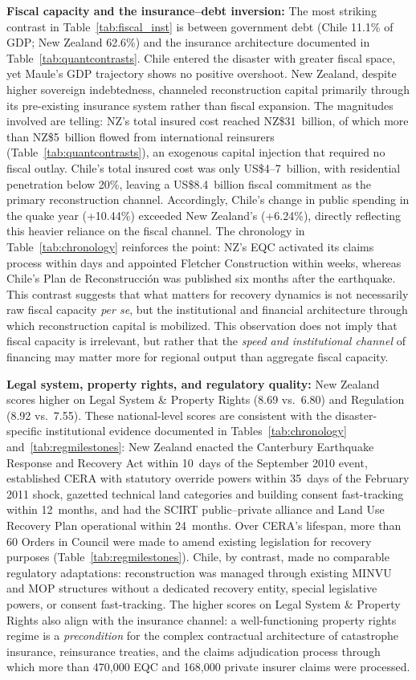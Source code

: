 \documentclass[12pt]{article}
\begin{document}
\textbf{Fiscal capacity and the insurance--debt inversion:} The most striking contrast in Table~\ref{tab:fiscal_inst} is between government debt (Chile 11.1\% of GDP; New Zealand 62.6\%) and the insurance architecture documented in Table~\ref{tab:quantcontrasts}. Chile entered the disaster with greater fiscal space, yet Maule's GDP trajectory shows no positive overshoot. New Zealand, despite higher sovereign indebtedness, channeled reconstruction capital primarily through its pre-existing insurance system rather than fiscal expansion. The magnitudes involved are telling: NZ's total insured cost reached NZ\$31~billion, of which more than NZ\$5~billion flowed from international reinsurers (Table~\ref{tab:quantcontrasts}), an exogenous capital injection that required no fiscal outlay. Chile's total insured cost was only US\$4--7~billion, with residential penetration below 20\%, leaving a US\$8.4~billion fiscal commitment as the primary reconstruction channel. Accordingly, Chile's change in public spending in the quake year (+10.44\%) exceeded New Zealand's (+6.24\%), directly reflecting this heavier reliance on the fiscal channel. The chronology in Table~\ref{tab:chronology} reinforces the point: NZ's EQC activated its claims process within days and appointed Fletcher Construction within weeks, whereas Chile's Plan de Reconstrucci{\'o}n was published six months after the earthquake. This contrast suggests that what matters for recovery dynamics is not necessarily raw fiscal capacity \textit{per se}, but the institutional and financial architecture through which reconstruction capital is mobilized. This observation does not imply that fiscal capacity is irrelevant, but rather that the \textit{speed and institutional channel} of financing may matter more for regional output than aggregate fiscal capacity.

\textbf{Legal system, property rights, and regulatory quality:} New Zealand scores higher on Legal System \& Property Rights (8.69 vs.\ 6.80) and Regulation (8.92 vs.\ 7.55). These national-level scores are consistent with the disaster-specific institutional evidence documented in Tables~\ref{tab:chronology} and~\ref{tab:regmilestones}: New Zealand enacted the Canterbury Earthquake Response and Recovery Act within 10~days of the September 2010 event, established CERA with statutory override powers within 35~days of the February 2011 shock, gazetted technical land categories and building consent fast-tracking within 12~months, and had the SCIRT public--private alliance and Land Use Recovery Plan operational within 24~months. Over CERA's lifespan, more than 60 Orders in Council were made to amend existing legislation for recovery purposes (Table~\ref{tab:regmilestones}). Chile, by contrast, made no comparable regulatory adaptations: reconstruction was managed through existing MINVU and MOP structures without a dedicated recovery entity, special legislative powers, or consent fast-tracking. The higher scores on Legal System \& Property Rights also align with the insurance channel: a well-functioning property rights regime is a \textit{precondition} for the complex contractual architecture of catastrophe insurance, reinsurance treaties, and the claims adjudication process through which more than 470,000 EQC and 168,000 private insurer claims were processed.
\end{document}

